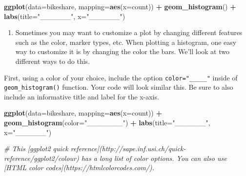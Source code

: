 \documentclass[]{book}
\newenvironment{Shaded}{\begin{snugshade}}{\end{snugshade}}
\newcommand{\KeywordTok}[1]{\textcolor[rgb]{0.13,0.29,0.53}{\textbf{#1}}}
\newcommand{\DataTypeTok}[1]{\textcolor[rgb]{0.13,0.29,0.53}{#1}}
\newcommand{\StringTok}[1]{\textcolor[rgb]{0.31,0.60,0.02}{#1}}
\newcommand{\CommentTok}[1]{\textcolor[rgb]{0.56,0.35,0.01}{\textit{#1}}}
\newcommand{\OperatorTok}[1]{\textcolor[rgb]{0.81,0.36,0.00}{\textbf{#1}}}
\newcommand{\NormalTok}[1]{#1}
\providecommand{\tightlist}{%
  \setlength{\itemsep}{0pt}\setlength{\parskip}{0pt}}
\begin{document}
\begin{Shaded}
\begin{Highlighting}[]
\KeywordTok{ggplot}\NormalTok{(}\DataTypeTok{data=}\NormalTok{bikeshare, }\DataTypeTok{mapping=}\KeywordTok{aes}\NormalTok{(}\DataTypeTok{x=}\NormalTok{count)) }\OperatorTok{+}\StringTok{ }
\StringTok{  }\KeywordTok{geom_histogram}\NormalTok{() }\OperatorTok{+}
\StringTok{  }\KeywordTok{labs}\NormalTok{(}\DataTypeTok{title=}\StringTok{"______"}\NormalTok{, }\DataTypeTok{x=}\StringTok{"______"}\NormalTok{)}
\end{Highlighting}
\end{Shaded}

\begin{enumerate}
\def\labelenumi{\arabic{enumi}.}
\setcounter{enumi}{4}
\tightlist
\item
  Sometimes you may want to customize a plot by changing different
  features such as the color, marker types, etc. When plotting a
  histogram, one easy way to customize it is by changing the color the
  bars. We'll look at two different ways to do this.
\end{enumerate}

First, using a color of your choice, include the option
\texttt{color="\_\_\_\_\_"} inside of \texttt{geom\_histogram()}
function. Your code will look similar this. Be sure to also include an
informative title and label for the x-axis.

\begin{Shaded}
\begin{Highlighting}[]
\KeywordTok{ggplot}\NormalTok{(}\DataTypeTok{data=}\NormalTok{bikeshare, }\DataTypeTok{mapping=}\KeywordTok{aes}\NormalTok{(}\DataTypeTok{x=}\NormalTok{count)) }\OperatorTok{+}\StringTok{ }
\StringTok{  }\KeywordTok{geom_histogram}\NormalTok{(}\DataTypeTok{color=}\StringTok{"_______"}\NormalTok{) }\OperatorTok{+}
\StringTok{  }\KeywordTok{labs}\NormalTok{(}\DataTypeTok{title=}\StringTok{"______"}\NormalTok{, }\DataTypeTok{x=}\StringTok{"______"}\NormalTok{)}
\end{Highlighting}
\end{Shaded}

\begin{Shaded}
\begin{Highlighting}[]
\CommentTok{# This [ggplot2 quick reference](http://sape.inf.usi.ch/quick-reference/ggplot2/colour) has a long list of color options. You can also use [HTML color codes](https://htmlcolorcodes.com/).}
\end{Highlighting}
\end{Shaded}
\end{document}
